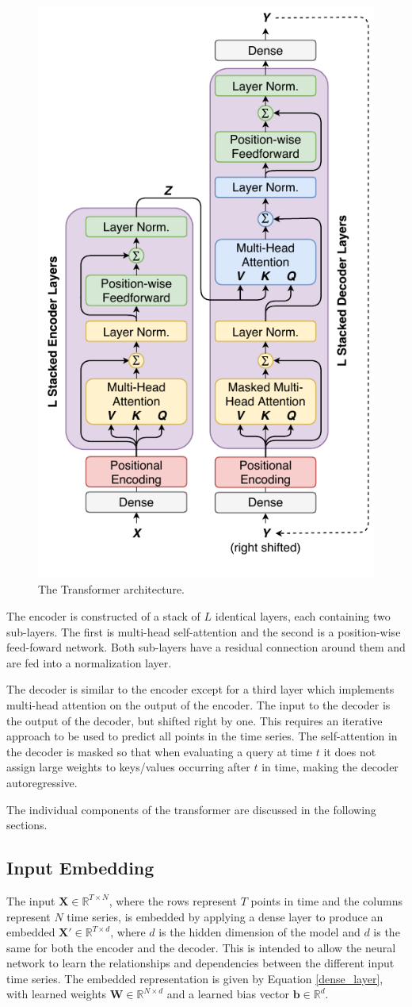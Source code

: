 \begin{figure}[htbp]
	\centerline{\includegraphics[trim=0 0.8cm 0 0, width=.35\textwidth]{images/transformer.pdf}}
	\caption{The Transformer architecture.}
	\label{fig:transformer}
\end{figure}

The encoder is constructed of a stack of $L$ identical layers, each containing two sub-layers.
The first is multi-head self-attention and the second is a position-wise feed-foward network.
Both sub-layers have a residual connection around them and are fed into a normalization layer.

The decoder is similar to the encoder except for a third layer which implements multi-head attention on the output of the encoder.
The input to the decoder is the output of the decoder, but shifted right by one.
This requires an iterative approach to be used to predict all points in the time series.
The self-attention in the decoder is masked so that when evaluating a query at time $t$ it does not assign large weights to keys/values occurring after $t$ in time, making the decoder autoregressive.

The individual components of the transformer are discussed in the following sections.

\subsection{Input Embedding}
The input $\boldsymbol{X} \in \mathbb{R}^{T \times N}$, where the rows represent $T$ points in time and the columns represent $N$ time series, is embedded by applying a dense layer to produce an embedded $\boldsymbol{X'} \in \mathbb{R}^{T \times d}$, where $d$ is the hidden dimension of the model and $d$ is the same for both the encoder and the decoder.
This is intended to allow the neural network to learn the relationships and dependencies between the different input time series.
The embedded representation is given by Equation \ref{dense_layer}, with learned weights $\boldsymbol{W} \in \mathbb{R}^{N \times d}$ and a learned bias vector $\boldsymbol{b} \in \mathbb{R}^{d}$.

